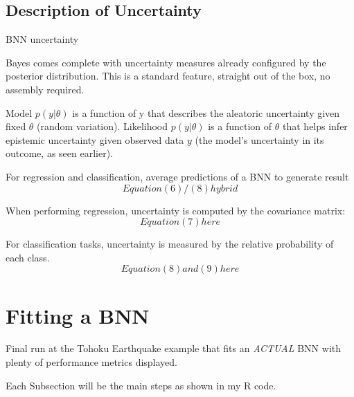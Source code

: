 \subsection{Description of Uncertainty}

BNN uncertainty \cite{Jospin}

Bayes comes complete with uncertainty measures already configured by the posterior distribution.  This is a standard feature, straight out of the box, no assembly required.


Model $p(y|\theta)$ is a function of y that describes the aleatoric uncertainty given fixed $\theta$ (random variation).
Likelihood $p(y|\theta)$ is a function of $\theta$ that helps infer epistemic uncertainty given observed data $y$ (the model's uncertainty in its outcome, as seen earlier).


For regression and classification, average predictions of a BNN to generate result
$$
Equation (6) / (8) hybrid
$$

When performing regression, uncertainty is computed by the covariance matrix:
$$
Equation (7) here
$$

For classification tasks, uncertainty is measured by the relative probability of each class.
$$
Equation (8) and (9) here
$$

\section{Fitting a BNN}

Final run at the Tohoku Earthquake example that fits an \textit{ACTUAL} BNN with plenty of performance metrics displayed.


Each Subsection will be the main steps as shown in my R code.